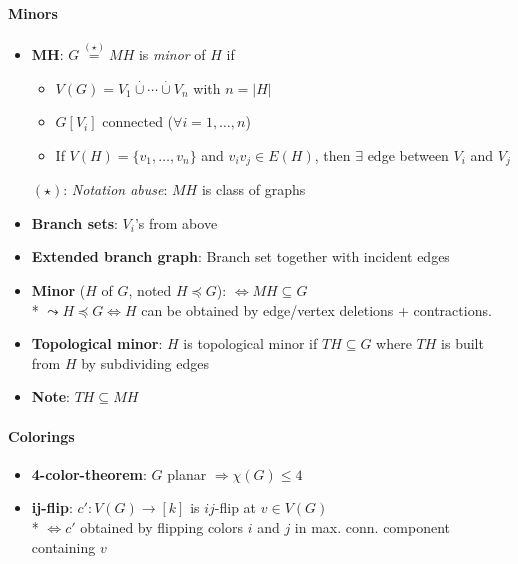 \paragraph{Minors}
\begin{itemize}
  \item \textbf{MH}: $ G \overset{(\star)}{=} MH $ is \emph{minor} of $ H $ if
  \begin{itemize}
    \item $ V(G) = V_1 \overset{\cdot}{\cup} \cdots \overset{\cdot}{\cup} V_n $ with $ n = \vert H \vert $
    \item $ G[V_i] $ connected ($ \forall i = 1, \dots, n $)
    \item If $ V(H) = \{ v_1, \dots, v_n \} $ and $ v_iv_j \in E(H) $, then $ \exists $ edge between $ V_i $ and $ V_j $
  \end{itemize}
  $ (\star) $: \emph{Notation abuse}: $ MH $ is class of graphs
  \item \textbf{Branch sets}: $ V_i $'s from above
  \item \textbf{Extended branch graph}: Branch set together with incident edges
  \item \textbf{Minor} ($ H $ of $ G $, noted $ H \preccurlyeq G $): $ \Leftrightarrow MH \subseteq G $ \\*
    $ \leadsto H \preccurlyeq G \Leftrightarrow H $ can be obtained by edge/vertex deletions + contractions.
  \item \textbf{Topological minor}: $ H $ is topological minor if $ TH \subseteq G $ where $ TH $ is built from $ H $ by subdividing edges
  \item \textbf{Note}: $ TH \subseteq MH $
\end{itemize}

\paragraph{Colorings}
\begin{itemize}
  \item \textbf{4-color-theorem}: $ G $ planar $ \Rightarrow \chi(G) \leq 4 $ 
  \item \textbf{ij-flip}: $ c': V(G) \to [k] $ is $ ij $-flip at $ v \in V(G) $ \\*
    $ \Leftrightarrow c' $ obtained by flipping colors $ i $ and $ j $ in max. conn. component containing $ v $
\end{itemize}